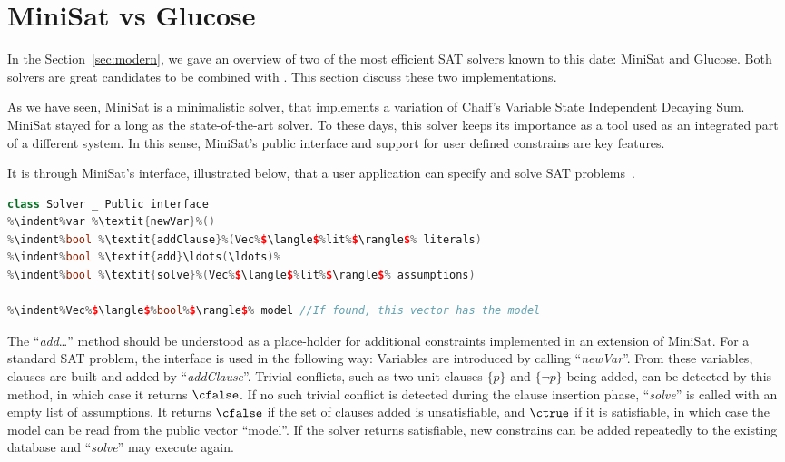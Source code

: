 \section{MiniSat vs Glucose}
In the Section~\ref{sec:modern}, we gave an overview of two of the most
efficient SAT solvers known to this date: MiniSat and Glucose. Both solvers are
great candidates to be combined with \ksp. This section discuss these two
implementations. 

As we have seen, MiniSat is a minimalistic solver, that implements a variation
of Chaff's Variable State Independent Decaying Sum. MiniSat stayed for a long as
the state-of-the-art solver. To these days, this solver keeps its
importance as a tool used as an integrated part of a different system. In this
sense, MiniSat's public interface and support for user defined constrains are
key features.

It is through MiniSat's interface, illustrated below, that a user application
can specify and solve SAT problems~\cite{een2003extensible}. 

\begin{lstlisting}[frame=single, language=C++,morekeywords={var,Solver,Vec,lit},escapechar=\%,
commentstyle=\color{gray}]
class Solver _ Public interface
%\indent%var %\textit{newVar}%()
%\indent%bool %\textit{addClause}%(Vec%$\langle$%lit%$\rangle$% literals)
%\indent%bool %\textit{add}\ldots(\ldots)%
%\indent%bool %\textit{solve}%(Vec%$\langle$%lit%$\rangle$% assumptions)

%\indent%Vec%$\langle$%bool%$\rangle$% model //If found, this vector has the model
\end{lstlisting}

The ``\textit{add}\ldots'' method should be understood as a place-holder for
additional constraints implemented in an extension of MiniSat. For a standard
SAT problem, the interface is used in the following way: Variables are
introduced by calling ``\textit{newVar}''. From these variables, clauses are
built and added by ``\textit{addClause}''.  Trivial conflicts, such as two unit
clauses $\{p\}$ and $\{\neg p\}$ being added, can be detected by this method, in
which case it returns $\cfalse$. If no such trivial conflict is detected during
the clause insertion phase, ``\textit{solve}'' is called with an empty list of
assumptions. It returns $\cfalse$ if the set of clauses added is unsatisfiable,
and $\ctrue$ if it is satisfiable, in which case the model can be read from the
public vector ``model''.  If the solver returns satisfiable, new constrains can
be added repeatedly to the existing database and ``\textit{solve}'' may execute again. 

